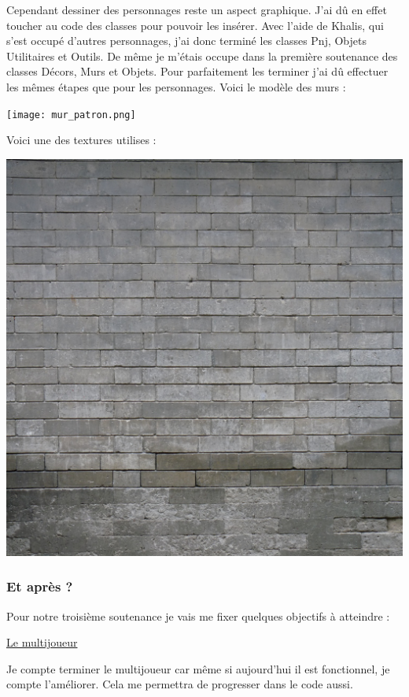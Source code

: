 \documentclass{article}
\begin{document}
\par
Cependant dessiner des personnages reste un aspect graphique. J’ai dû en effet toucher au code des classes pour pouvoir les insérer. Avec l’aide de Khalis, qui s’est occupé d’autres personnages, j’ai donc terminé les classes Pnj, Objets Utilitaires et Outils.
De même je m’étais occupe dans la première soutenance des classes Décors, Murs et Objets. Pour parfaitement les terminer j’ai dû effectuer les mêmes étapes que pour les personnages.
\newpage
Voici le modèle des murs :
\begin{center}
\texttt{[image: mur\_patron.png]}
\end{center}
Voici une des textures utilises :
\begin{center}
\includegraphics[scale=0.5]{mur_brique.png}
\end{center}
\subsubsection{Et après ?}
\par
Pour notre troisième soutenance je vais me fixer quelques objectifs à atteindre :
\newline

\par
\underline{Le multijoueur}
\newline
\par
Je compte terminer le multijoueur car même si aujourd'hui il est fonctionnel, je compte l'améliorer. Cela me permettra de progresser dans le code aussi.
\newline
\end{document}
